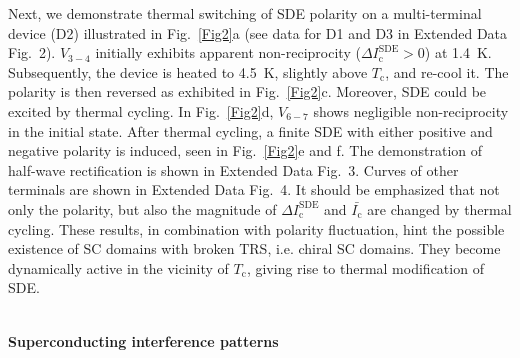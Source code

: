 \documentclass[article,reprint,amsmath,amssymb,superscriptaddress,longbibliography]{revtex4-1}
\begin{document}
Next, we demonstrate thermal switching of SDE polarity on a multi-terminal device (D2) illustrated in Fig.~\ref{Fig2}a (see data for D1 and D3 in Extended Data Fig.~2). $V_{3-4}$ initially exhibits apparent non-reciprocity ($\Delta I^\textrm{SDE}_\textrm{c}>0$) at 1.4~K. 
Subsequently, the device is heated to 4.5~K, slightly above $T_\textrm{c}$, and re-cool it. The polarity is then reversed as exhibited in Fig.~\ref{Fig2}c. Moreover, SDE could be excited by thermal cycling. In Fig.~\ref{Fig2}d, $V_{6-7}$ shows negligible non-reciprocity in the initial state. After thermal cycling, a finite SDE with either positive and negative polarity is induced, seen in Fig.~\ref{Fig2}e and f. The demonstration of half-wave rectification is shown in Extended Data Fig.~3. Curves of other terminals are shown in Extended Data Fig.~4. It should be emphasized that not only the polarity, but also the magnitude of $\Delta I^\textrm{SDE}_\textrm{c}$ and $\bar{I_\textrm{c}}$ are changed by thermal cycling. These results, in combination with polarity fluctuation, hint the possible existence of SC domains with broken TRS, i.e. chiral SC domains. They become dynamically active in the vicinity of $T_\textrm{c}$, giving rise to thermal modification of SDE. %


~\\
\noindent\textbf{Superconducting interference patterns}
\end{document}
